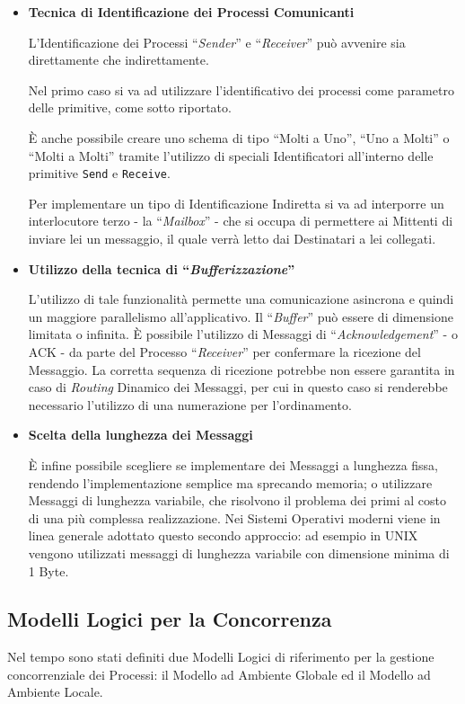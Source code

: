 \begin{itemize}
    \item \textbf{Tecnica di Identificazione dei Processi Comunicanti} \par
        L'Identificazione dei Processi ``\textit{Sender}'' e ``\textit{Receiver}'' può avvenire sia direttamente che indirettamente. \par
        Nel primo caso si va ad utilizzare l'identificativo dei processi come parametro delle primitive, come sotto riportato.
        
        È anche possibile creare uno schema di tipo ``Molti a Uno'', ``Uno a Molti'' o ``Molti a Molti'' tramite l'utilizzo di speciali Identificatori all'interno delle primitive \texttt{Send} e \texttt{Receive}.
        
        Per implementare un tipo di Identificazione Indiretta si va ad interporre un interlocutore terzo - la ``\textit{Mailbox}'' - che si occupa di permettere ai Mittenti di inviare lei un messaggio, il quale verrà letto dai Destinatari a lei collegati.
    \item \textbf{Utilizzo della tecnica di ``\textit{Bufferizzazione}''} \par
        L'utilizzo di tale funzionalità permette una comunicazione asincrona e quindi un maggiore parallelismo all'applicativo. Il ``\textit{Buffer}'' può essere di dimensione limitata o infinita. È possibile l'utilizzo di Messaggi di ``\textit{Acknowledgement}'' - o ACK - da parte del Processo ``\textit{Receiver}'' per confermare la ricezione del Messaggio. La corretta sequenza di ricezione potrebbe non essere garantita in caso di \textit{Routing} Dinamico dei Messaggi, per cui in questo caso si renderebbe necessario l'utilizzo di una numerazione per l'ordinamento.
    \item \textbf{Scelta della lunghezza dei Messaggi} \par
        È infine possibile scegliere se implementare dei Messaggi a lunghezza fissa, rendendo l'implementazione semplice ma sprecando memoria; o utilizzare Messaggi di lunghezza variabile, che risolvono il problema dei primi al costo di una più complessa realizzazione. Nei Sistemi Operativi moderni viene in linea generale adottato questo secondo approccio: ad esempio in UNIX vengono utilizzati messaggi di lunghezza variabile con dimensione minima di 1 Byte.
\end{itemize}
\subsection{Modelli Logici per la Concorrenza}
Nel tempo sono stati definiti due Modelli Logici di riferimento per la gestione concorrenziale dei Processi: il Modello ad Ambiente Globale ed il Modello ad Ambiente Locale.
